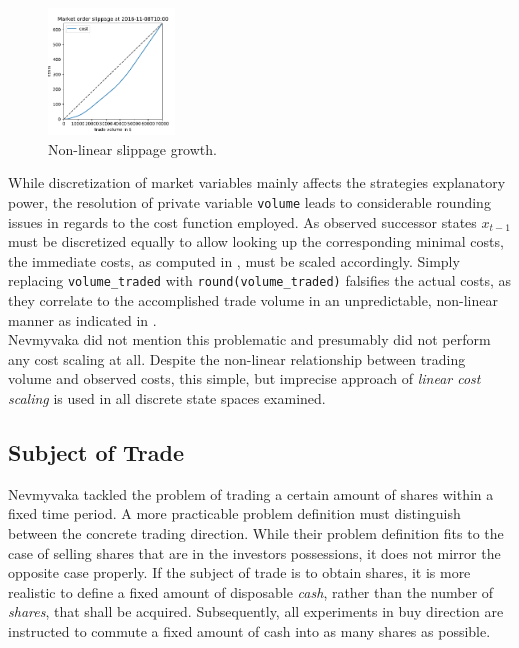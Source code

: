 \begin{figure}
	\centering
	\includegraphics[width=0.3\textwidth,trim={0 0.2cm 0 0.7cm},clip]{content/drawings/nonlinearcosts}
	\caption{Non-linear slippage growth.}
	\label{fig:nonlinearcosts}
\end{figure}

While discretization of market variables mainly affects the strategies explanatory power, the resolution of private variable \lstinline!volume! leads to considerable rounding issues in regards to the cost function employed. As observed successor states $x_{t-1}$ must be discretized equally to allow looking up the corresponding minimal costs, the immediate costs, as computed in , must be scaled accordingly. Simply replacing \lstinline!volume_traded! with \lstinline!round(volume_traded)! falsifies the actual costs, as they correlate to the accomplished trade volume in an  unpredictable, non-linear manner as indicated in .\\

Nevmyvaka \etal \Cite{Nevmyvaka:2006} did not mention this problematic and presumably did not perform any cost scaling at all. Despite the non-linear relationship between trading volume and observed costs, this simple, but imprecise approach of \emph{linear cost scaling} is used in all discrete state spaces examined.

\subsection{Subject of Trade}
\label{chap:backwardalgorithm:discussion:subjectTrade}
Nevmyvaka \etal \cite{Nevmyvaka:2006} tackled the problem of trading a certain amount of shares within a fixed time period. A more practicable problem definition must distinguish between the concrete trading direction. While their problem definition fits to the case of selling shares that are in the investors possessions, it does not mirror the opposite case properly. If the subject of trade is to obtain shares, it is more realistic to define a fixed amount of disposable \emph{cash}, rather than the number of \emph{shares}, that shall be acquired. Subsequently, all experiments in buy direction are instructed to commute a fixed amount of cash into as many shares as possible.\\
 
